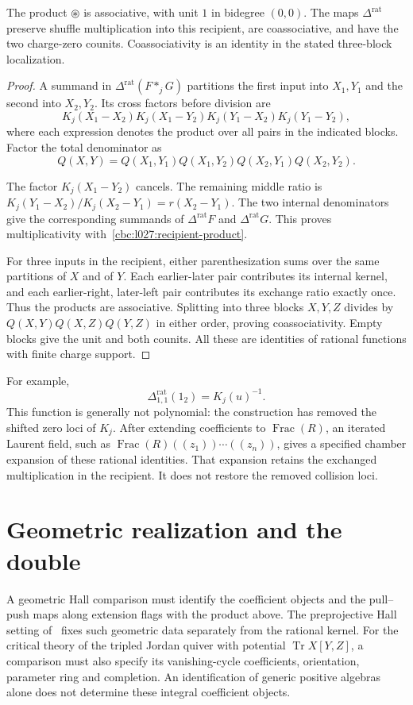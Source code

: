 \begin{proposition}
The product $\circledast$ is associative, with unit $1$ in
bidegree $(0,0)$.  The maps $\Delta^{\mathrm{rat}}$ preserve
shuffle multiplication into this recipient, are coassociative,
and have the two charge-zero counits.  Coassociativity is an
identity in the stated three-block localization.
\end{proposition}
\begin{proof}
A summand in $\Delta^{\mathrm{rat}}(F*_jG)$ partitions the first
input into $X_1,Y_1$ and the second into $X_2,Y_2$.
Its cross factors before division are
\[
 K_j(X_1-X_2)K_j(X_1-Y_2)
 K_j(Y_1-X_2)K_j(Y_1-Y_2),
\]
where each expression denotes the product over all pairs in the
indicated blocks.  Factor the total denominator as
\[
 Q(X,Y)=Q(X_1,Y_1)Q(X_1,Y_2)
 Q(X_2,Y_1)Q(X_2,Y_2).
\]

The factor $K_j(X_1-Y_2)$ cancels.  The remaining middle ratio is
$K_j(Y_1-X_2)/K_j(X_2-Y_1)=r(X_2-Y_1)$.
The two internal denominators give the corresponding summands of
$\Delta^{\mathrm{rat}}F$ and $\Delta^{\mathrm{rat}}G$.
This proves multiplicativity with~\eqref{cbc:l027:recipient-product}.

For three inputs in the recipient, either parenthesization sums
over the same partitions of $X$ and of $Y$.  Each earlier-later
pair contributes its internal kernel, and each earlier-right,
later-left pair contributes its exchange ratio exactly once.
Thus the products are associative.  Splitting into three blocks
$X,Y,Z$ divides by $Q(X,Y)Q(X,Z)Q(Y,Z)$ in either order, proving
coassociativity.  Empty blocks give the unit and both counits.
All these are identities of rational functions with finite charge
support.
\end{proof}

For example,
\[
 \Delta^{\mathrm{rat}}_{1,1}(1_2)=K_j(u)^{-1}.
\]
This function is generally not polynomial: the construction has
removed the shifted zero loci of $K_j$.
After extending coefficients to $\operatorname{Frac}(R)$, an
iterated Laurent field, such as
$\operatorname{Frac}(R)((z_1))\cdots((z_n))$, gives a specified
chamber expansion of these rational identities.
That expansion retains the exchanged multiplication in the
recipient.  It does not restore the removed collision loci.

\section{Geometric realization and the double}
A geometric Hall comparison must identify the coefficient objects
and the pull--push maps along extension flags with the product
above.  The preprojective Hall setting of~\cite{SVYangians} fixes
such geometric data separately from the rational kernel.
For the critical theory of the tripled Jordan quiver with potential
$\operatorname{Tr}X[Y,Z]$, a comparison must also specify its
vanishing-cycle coefficients, orientation, parameter ring and
completion.  An identification of generic positive algebras alone
does not determine these integral coefficient objects.

